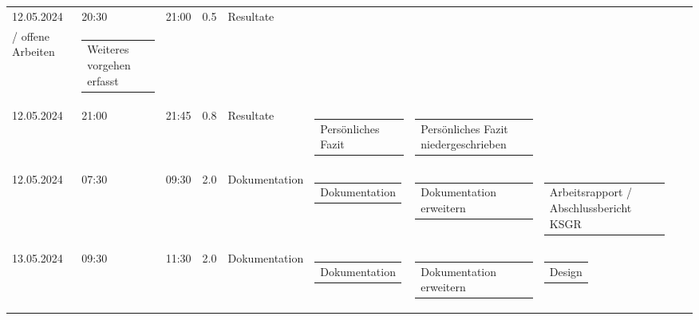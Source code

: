 {\begin{longtable}[H]{lllrllllll}
12.05.2024 & 20:30 & 21:00 & 0.5 & Resultate & \begin{tabular}[c]{@{}l@{}}Weiteres Vorgehen\\/ offene Arbeiten\end{tabular} & \begin{tabular}[c]{@{}l@{}}Weiteres vorgehen erfasst\end{tabular} & \begin{tabular}[c]{@{}l@{}}\end{tabular} & \begin{tabular}[c]{@{}l@{}}\end{tabular} & \begin{tabular}[c]{@{}l@{}}\end{tabular} \\
12.05.2024 & 21:00 & 21:45 & 0.8 & Resultate & \begin{tabular}[c]{@{}l@{}}Persönliches Fazit\end{tabular} & \begin{tabular}[c]{@{}l@{}}Persönliches Fazit niedergeschrieben\end{tabular} & \begin{tabular}[c]{@{}l@{}}\end{tabular} & \begin{tabular}[c]{@{}l@{}}\end{tabular} & \begin{tabular}[c]{@{}l@{}}\end{tabular} \\
12.05.2024 & 07:30 & 09:30 & 2.0 & Dokumentation & \begin{tabular}[c]{@{}l@{}}Dokumentation\end{tabular} & \begin{tabular}[c]{@{}l@{}}Dokumentation erweitern\end{tabular} & \begin{tabular}[c]{@{}l@{}}Arbeitsrapport / Abschlussbericht KSGR\end{tabular} & \begin{tabular}[c]{@{}l@{}}\end{tabular} & \begin{tabular}[c]{@{}l@{}}\end{tabular} \\
13.05.2024 & 09:30 & 11:30 & 2.0 & Dokumentation & \begin{tabular}[c]{@{}l@{}}Dokumentation\end{tabular} & \begin{tabular}[c]{@{}l@{}}Dokumentation erweitern\end{tabular} & \begin{tabular}[c]{@{}l@{}}Design\end{tabular} & \begin{tabular}[c]{@{}l@{}}\end{tabular} & \begin{tabular}[c]{@{}l@{}}\end{tabular} \\

\end{longtable}}
